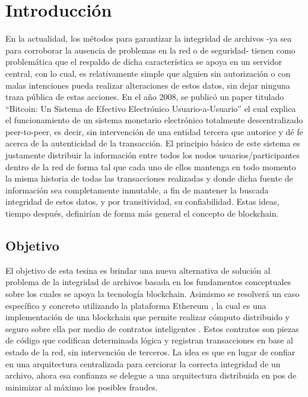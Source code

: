 \section{Introducción}

En la actualidad, los métodos para garantizar la integridad de archivos -ya sea para corroborar la ausencia de problemas en la red o de seguridad- tienen como problemática que el respaldo de dicha característica se apoya en un servidor central, con lo cual, es relativamente simple que alguien sin autorización o con malas intenciones pueda realizar alteraciones de estos datos, sin dejar ninguna traza pública de estas acciones.
En el año 2008, se publicó un paper titulado ``Bitcoin: Un Sistema de Efectivo Electrónico Usuario-a-Usuario''\cite{Nakamoto2008b} el cual explica el funcionamiento de un sistema monetario electrónico totalmente descentralizado peer-to-peer, es decir, sin intervención de una entidad tercera que autorice y dé fe acerca de la autenticidad de la transacción. El principio básico de este sistema es justamente distribuir la información entre todos los nodos usuarios/participantes dentro de la red de forma tal que cada uno de ellos mantenga en todo momento la misma historia de todas las transacciones realizadas y donde dicha fuente de información sea completamente inmutable, a fin de mantener la buscada integridad de estos datos, y por transitividad, su confiabilidad. Estas ideas, tiempo después, definirían de forma más general el concepto de blockchain.

\subsection{Objetivo}

El objetivo de esta tesina es brindar una nueva alternativa de solución al problema de la integridad de archivos basada en los fundamentos conceptuales sobre los cuales se apoya la tecnología blockchain.
Asimismo se resolverá un caso específico y concreto utilizando la plataforma Ethereum \cite{Buterin2014}, la cual es una implementación de una blockchain que permite realizar cómputo distribuido y seguro sobre ella por medio de contratos inteligentes \cite{Szabo1997}. Estos contratos son piezas de código que codifican determinada lógica y registran transacciones en base al estado de la red, sin intervención de terceros.
La idea es que en lugar de confiar en una arquitectura centralizada para cerciorar la correcta integridad de un archivo, ahora esa confianza se delegue a una arquitectura distribuida en pos de minimizar al máximo los posibles fraudes.

